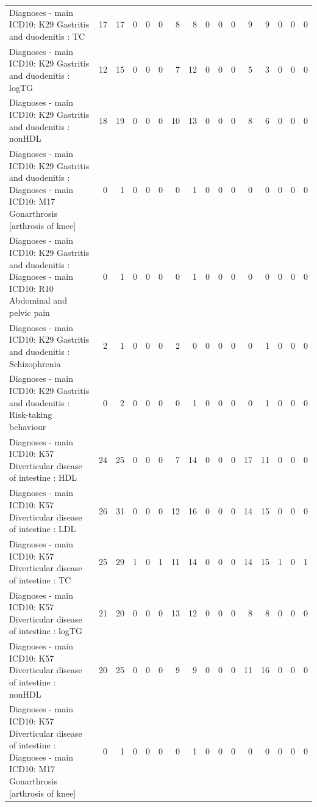 \begin{table}[ht]
\begin{tabular}{lrrrrrrrrrrrrrrr}
  Diagnoses - main ICD10: K29 Gastritis and duodenitis : TC &  17 &  17 &   0 &   0 &   0 &   8 &   8 &   0 &   0 &   0 &   9 &   9 &   0 &   0 &   0 \\ 
  Diagnoses - main ICD10: K29 Gastritis and duodenitis : logTG &  12 &  15 &   0 &   0 &   0 &   7 &  12 &   0 &   0 &   0 &   5 &   3 &   0 &   0 &   0 \\ 
  Diagnoses - main ICD10: K29 Gastritis and duodenitis : nonHDL &  18 &  19 &   0 &   0 &   0 &  10 &  13 &   0 &   0 &   0 &   8 &   6 &   0 &   0 &   0 \\ 
  Diagnoses - main ICD10: K29 Gastritis and duodenitis : Diagnoses - main ICD10: M17 Gonarthrosis [arthrosis of knee] &   0 &   1 &   0 &   0 &   0 &   0 &   1 &   0 &   0 &   0 &   0 &   0 &   0 &   0 &   0 \\ 
  Diagnoses - main ICD10: K29 Gastritis and duodenitis : Diagnoses - main ICD10: R10 Abdominal and pelvic pain &   0 &   1 &   0 &   0 &   0 &   0 &   1 &   0 &   0 &   0 &   0 &   0 &   0 &   0 &   0 \\ 
  Diagnoses - main ICD10: K29 Gastritis and duodenitis : Schizophrenia &   2 &   1 &   0 &   0 &   0 &   2 &   0 &   0 &   0 &   0 &   0 &   1 &   0 &   0 &   0 \\ 
  Diagnoses - main ICD10: K29 Gastritis and duodenitis : Risk-taking behaviour &   0 &   2 &   0 &   0 &   0 &   0 &   1 &   0 &   0 &   0 &   0 &   1 &   0 &   0 &   0 \\ 
  Diagnoses - main ICD10: K57 Diverticular disease of intestine : HDL &  24 &  25 &   0 &   0 &   0 &   7 &  14 &   0 &   0 &   0 &  17 &  11 &   0 &   0 &   0 \\ 
  Diagnoses - main ICD10: K57 Diverticular disease of intestine : LDL &  26 &  31 &   0 &   0 &   0 &  12 &  16 &   0 &   0 &   0 &  14 &  15 &   0 &   0 &   0 \\ 
  Diagnoses - main ICD10: K57 Diverticular disease of intestine : TC &  25 &  29 &   1 &   0 &   1 &  11 &  14 &   0 &   0 &   0 &  14 &  15 &   1 &   0 &   1 \\ 
  Diagnoses - main ICD10: K57 Diverticular disease of intestine : logTG &  21 &  20 &   0 &   0 &   0 &  13 &  12 &   0 &   0 &   0 &   8 &   8 &   0 &   0 &   0 \\ 
  Diagnoses - main ICD10: K57 Diverticular disease of intestine : nonHDL &  20 &  25 &   0 &   0 &   0 &   9 &   9 &   0 &   0 &   0 &  11 &  16 &   0 &   0 &   0 \\ 
  Diagnoses - main ICD10: K57 Diverticular disease of intestine : Diagnoses - main ICD10: M17 Gonarthrosis [arthrosis of knee] &   0 &   1 &   0 &   0 &   0 &   0 &   1 &   0 &   0 &   0 &   0 &   0 &   0 &   0 &   0 \\ 

\end{tabular}
\end{table}
